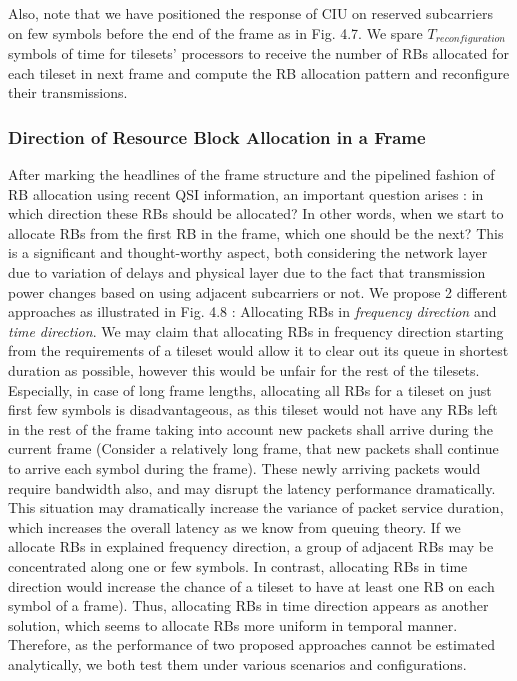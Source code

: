 Also, note that we have positioned the response of CIU on reserved subcarriers on few symbols before the end of the frame as in Fig. 4.7. We spare $T_{reconfiguration}$ symbols of time for tilesets' processors to receive the number of RBs allocated for each tileset in next frame and compute the RB allocation pattern and reconfigure their transmissions. 
								
\subsubsection{Direction of Resource Block Allocation in a Frame}

After marking the headlines of the frame structure and the pipelined fashion of RB allocation using recent QSI information, an important question arises : in which direction these RBs should be allocated? In other words, when we start to allocate RBs from the first RB in the frame, which one should be the next? This is a significant and thought-worthy aspect, both considering the network layer due to variation of delays and physical layer due to the fact that transmission power changes based on using adjacent subcarriers or not. We propose 2 different approaches as illustrated in Fig. 4.8 : Allocating RBs in \textit{frequency direction} and \textit{time direction}. We may claim that allocating RBs in frequency direction starting from the requirements of a tileset would allow it to clear out its queue in shortest duration as possible, however this would be unfair for the rest of the tilesets. Especially, in case of long frame lengths, allocating all RBs for a tileset on just first few symbols is disadvantageous, as this tileset would not have any RBs left in the rest of the frame taking into account new packets shall arrive during the current frame (Consider a relatively long frame, that new packets shall continue to arrive each symbol during the frame). These newly arriving packets would require bandwidth also, and may disrupt the latency performance dramatically. This situation may dramatically increase the variance of packet service duration, which increases the overall latency as we know from queuing theory. If we allocate RBs in explained frequency direction, a group of adjacent RBs may be concentrated along one or few symbols. In contrast, allocating RBs in time direction would increase the chance of a tileset to have at least one RB on each symbol of a frame). Thus, allocating RBs in time direction appears as another solution, which seems to allocate RBs more uniform in temporal manner.  Therefore, as the performance of two proposed approaches cannot be estimated analytically, we both test them under various scenarios and configurations. 

